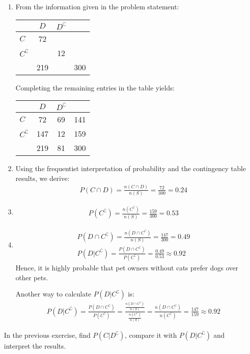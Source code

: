\begin{solution}
	\begin{enumerate}
		\item From the information given in the problem statement:
		\begin{center}
		\begin{tabular}{l|cc|c}
							& \( D \) & \( D^\complement \) &  \\ \hline
		\( C \)                & 72 & & \\ 
		\( C^\complement \)    & & 12 &  \\ \hline
							& 219 &  & 300
		\end{tabular}
		\end{center}
		Completing the remaining entries in the table yields:
		\begin{center}
		\begin{tabular}{l|cc|c}
							& \( D \) & \( D^\complement \) &  \\ \hline
		\( C \)                & 72 & 69 & 141 \\ 
		\( C^\complement \)    & 147 & 12 & 159  \\ \hline
							& 219 & 81 & 300
		\end{tabular}
		\end{center}
		\item Using the frequentist interpretation of probability and the contingency table results, we derive:
		\begin{align*}
			P(C \cap D) = \frac{n(C \cap D)}{n(S)} = \frac{72}{300} = 0.24
		\end{align*}
		\item \begin{align*}
			P(C^\complement) = \frac{n(C^\complement)}{n(S)} = \frac{159}{300} = 0.53
		\end{align*}
		\item \begin{gather*}
			P(D \cap C^\complement) = \frac{n(D \cap C^\complement)}{n(S)} = \frac{147}{300} = 0.49\\
			P(D | C^\complement) = \frac{P(D \cap C^\complement)}{P(C^\complement)} = \frac{0.49}{0.53} \approx 0.92
		\end{gather*}
		Hence, it is highly probable that pet owners without cats prefer dogs over other pets.

		Another way to calculate \( P(D | C^\complement) \) is:
		\begin{align*}
			P(D | C^\complement) = \frac{P(D \cap C^\complement)}{P(C^\complement)} = \frac{\frac{n(D \cap C^\complement)}{n(S)}}{\frac{n(C^\complement)}{n(S)}} = \frac{n(D \cap C^\complement)}{n(C^\complement)} = \frac{147}{159} \approx 0.92
		\end{align*}
	\end{enumerate}
\end{solution}
\begin{ex}
	In the previous exercise, find \( P(C | D^\complement) \), compare it with \( P(D | C^\complement) \) and interpret the results.
\end{ex}